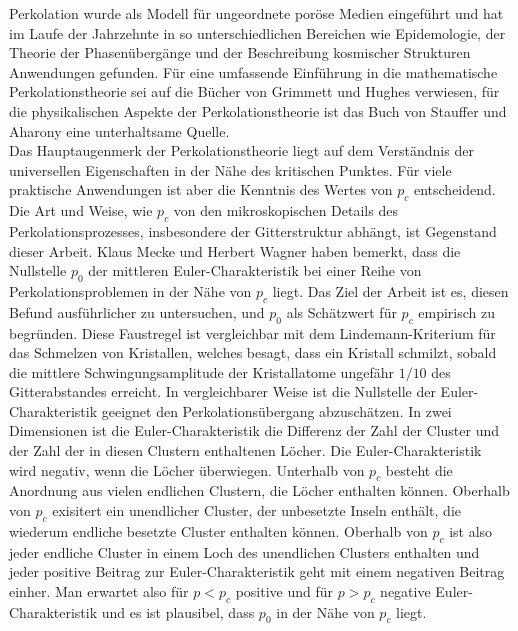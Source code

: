 Perkolation wurde als Modell f\"ur ungeordnete por\"ose Medien eingef\"uhrt und hat im Laufe der Jahrzehnte in so unterschiedlichen Bereichen wie Epidemologie, der Theorie der Phasen\"uberg\"ange und der Beschreibung kosmischer Strukturen Anwendungen gefunden. F\"ur eine umfassende Einf\"uhrung in die mathematische Perkolationstheorie sei auf die B\"ucher von Grimmett \cite{Grimmett:99} und Hughes \cite{Hughes:96} verwiesen, f\"ur die physikalischen Aspekte der Perkolationstheorie ist das Buch von Stauffer und Aharony \cite{Stauffer:95} eine unterhaltsame Quelle.\\

Das Hauptaugenmerk der Perkolationstheorie liegt auf dem Verst\"andnis der universellen Eigenschaften in der N\"ahe des kritischen Punktes. F\"ur viele praktische Anwendungen ist aber die Kenntnis des Wertes von $p_c$ entscheidend. Die Art und Weise, wie $p_c$ von den mikroskopischen Details des Perkolationsprozesses, insbesondere der Gitterstruktur abh\"angt, ist Gegenstand dieser Arbeit. Klaus Mecke und Herbert Wagner haben bemerkt, dass die Nullstelle $p_0$ der mittleren Euler-Charakteristik bei einer Reihe von Perkolationsproblemen in der N\"ahe von $p_c$ liegt. Das Ziel der Arbeit ist es, diesen Befund ausf\"uhrlicher zu untersuchen, und $p_0$ als Sch\"atzwert f\"ur $p_c$ empirisch zu begr\"unden. Diese Faustregel ist vergleichbar mit dem Lindemann-Kriterium f\"ur das Schmelzen von Kristallen, welches besagt, dass ein Kristall schmilzt, sobald die mittlere Schwingungsamplitude der Kristall\-atome ungef\"ahr $1/10$ des Gitterabstandes erreicht. In vergleichbarer Weise ist die Nullstelle der Euler-Charakteristik geeignet den Perkolations\"ubergang abzusch\"atzen. In zwei Dimensionen ist die Euler-Charakteristik die Differenz der Zahl der Cluster und der Zahl der in diesen Clustern enthaltenen L\"ocher. Die Euler-Charakteristik wird negativ, wenn die L\"ocher \"uberwiegen. Unterhalb von $p_c$ besteht die Anordnung aus vielen endlichen Clustern, die L\"ocher enthalten k\"onnen. Oberhalb von $p_c$ exisitert ein unendlicher Cluster, der unbesetzte Inseln enth\"alt, die wiederum endliche besetzte Cluster enthalten k\"onnen. Oberhalb von $p_c$ ist also jeder endliche Cluster in einem Loch des unendlichen Clusters enthalten und jeder positive Beitrag zur Euler-Charakteristik geht mit einem negativen Beitrag einher. Man erwartet also f\"ur $p<p_c$ positive und f\"ur $p>p_c$ negative Euler-Charakteristik und es ist plausibel, dass $p_0$ in der N\"ahe von $p_c$ liegt. 

